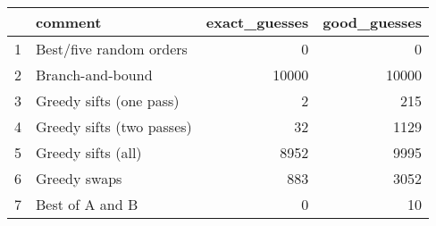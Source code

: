 \begin{table}[ht]
\centering
\begin{tabular}{rlrr}
  \hline
 & comment & exact\_guesses & good\_guesses \\ 
  \hline
1 & Best/five random orders &   0 &   0 \\ 
  2 & Branch-and-bound & 10000 & 10000 \\ 
  3 & Greedy sifts (one pass) &   2 & 215 \\ 
  4 & Greedy sifts (two passes) &  32 & 1129 \\ 
  5 & Greedy sifts (all) & 8952 & 9995 \\ 
  6 & Greedy swaps & 883 & 3052 \\ 
  7 & Best of A and B &   0 &  10 \\ 
   \hline
\end{tabular}
\end{table}
